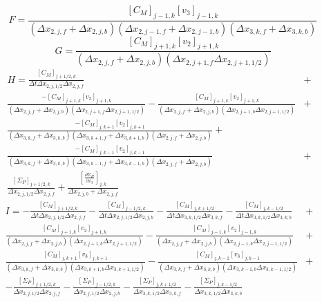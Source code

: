 \documentclass[11pt,letterpaper]{article}
\begin{document}
\begin{equation}
F = \frac{[C_M]_{j-1,k} [v_3]_{j-1,k} }{ \left( \Delta x_{2,j,f}+\Delta x_{2,j,b} \right) \left( \Delta x_{2,j-1,f}+\Delta x_{2,j-1,b} \right) \left( \Delta x_{3,k,f}+\Delta x_{3,k,b} \right) }
\end{equation}
\begin{equation}
G = \frac{[C_M]_{j+1,k} [v_{2}]_{j+1,k}}{\left( \Delta x_{2,j,f} + \Delta x_{2,j,b} \right) \left( \Delta x_{2,j+1,f} \Delta x_{2,j+1,1/2} \right)}
\end{equation}
\begin{eqnarray}
H = \frac{[C_M]_{j+1/2,k}}{\Delta t \Delta x_{2,j,1/2} \Delta x_{2,j,f}} &+& \nonumber \\
\frac{-[C_M]_{j+1,k} [v_{2}]_{j+1,k}}{\left( \Delta x_{2,j,f} + \Delta x_{2,j,b} \right) \left( \Delta x_{2,j+1,f} \Delta x_{2,j+1,1/2} \right)} - \frac{[C_M]_{j+1,k} [v_{2}]_{j+1,k}}{\left( \Delta x_{2,j,f} + \Delta x_{2,j,b} \right) \left( \Delta x_{2,j+1,b} \Delta x_{2,j+1,1/2} \right)} &+& \nonumber \\
\frac{-[C_M]_{j,k+1} [v_2]_{j,k+1} }{ \left( \Delta x_{3,k,f}+\Delta x_{3,k,b} \right) \left( \Delta x_{3,k+1,f}+\Delta x_{3,k+1,b} \right) \left( \Delta x_{2,j,f}+\Delta x_{2,j,b} \right) } + &~& \nonumber \\
 \frac{-[C_M]_{j,k-1} [v_2]_{j,k-1} }{ \left( \Delta x_{3,k,f}+\Delta x_{3,k,b} \right) \left( \Delta x_{3,k-1,f}+\Delta x_{3,k-1,b} \right) \left( \Delta x_{2,j,f}+\Delta x_{2,j,b} \right) } &+& \nonumber \\
\frac{ \left[ \Sigma_P \right]_{j+1/2,k} }{\Delta x_{2,j,1/2} \Delta x_{2,j,f}} + \frac{\left[ \frac{\partial \Sigma_H}{\partial x_3} \right]_{j,k}}{\Delta x_{2,j,b} + \Delta x_{2,j,f} }
\end{eqnarray}
\begin{eqnarray}
I = -\frac{[C_M]_{j+1/2,k}}{\Delta t \Delta x_{2,j,1/2} \Delta x_{2,j,f}}  - \frac{[C_M]_{j-1/2,k}}{\Delta t \Delta x_{2,j,1/2} \Delta x_{2,j,b}} - \frac{[C_M]_{j,k+1/2}}{\Delta t \Delta x_{3,k,1/2} \Delta x_{3,k,f}} - \frac{[C_M]_{j,k-1/2}}{\Delta t \Delta x_{3,k,1/2} \Delta x_{3,k,b}} &+& \nonumber \\
\frac{[C_M]_{j+1,k} [v_{2}]_{j+1,k}}{\left( \Delta x_{2,j,f} + \Delta x_{2,j,b} \right) \left( \Delta x_{2,j+1,b} \Delta x_{2,j+1,1/2} \right)}  - \frac{[C_M]_{j-1,k} [v_{2}]_{j-1,k}}{\left( \Delta x_{2,j,f} + \Delta x_{2,j,b} \right) \left( \Delta x_{2,j-1,b} \Delta x_{2,j-1,1/2} \right)} &+& \nonumber \\
\frac{[C_M]_{j,k+1} [v_{3}]_{j,k+1}}{\left( \Delta x_{3,k,f} + \Delta x_{3,k,b} \right) \left( \Delta x_{3,k+1,b} \Delta x_{3,k+1,1/2} \right)}  - \frac{[C_M]_{j,k-1} [v_{3}]_{j,k-1}}{\left( \Delta x_{3,k,f} + \Delta x_{3,k,b} \right) \left( \Delta x_{3,k-1,b} \Delta x_{3,k-1,1/2} \right)} &+& \nonumber \\
- \frac{ \left[ \Sigma_P \right]_{j+1/2,k}} {\Delta x_{2,j,1/2} \Delta x_{2,j,f}} - \frac{ \left[ \Sigma_P \right]_{j-1/2,k} }{\Delta x_{2,j,1/2} \Delta x_{2,j,b}} - \frac{ \left[ \Sigma_P \right]_{j,k+1/2}} {\Delta x_{3,k,1/2} \Delta x_{3,k,f}} - \frac{ \left[ \Sigma_P \right]_{j,k-1/2} }{\Delta x_{3,k,1/2} \Delta x_{3,k,b}}
\end{eqnarray}
\end{document}
